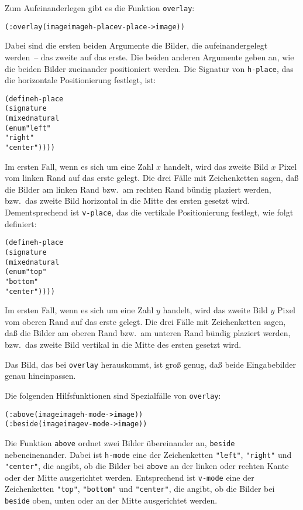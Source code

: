 Zum Aufeinanderlegen gibt es die Funktion \texttt{overlay}:
%
\begin{alltt}
(: overlay (image image h-place v-place -> image))
\end{alltt}
%
Dabei sind die ersten beiden Argumente die Bilder, die
aufeinandergelegt werden~-- das zweite auf das erste.
Die beiden anderen Argumente geben an, wie
die beiden Bilder zueinander positioniert werden.  Die Signatur
von \texttt{h-place}, das die horizontale Positionierung festlegt,
ist:
%
\begin{alltt}
(define h-place
   (signature
      (mixed natural
             (enum "left"
                     "right"
                     "center"))))
\end{alltt}
%
Im ersten Fall, wenn es sich um eine Zahl $x$ handelt, wird das zweite
Bild $x$ Pixel vom linken Rand auf das erste gelegt.  Die drei
Fälle mit Zeichenketten sagen, daß die Bilder am linken Rand bzw.\ am
rechten Rand bündig plaziert werden, bzw.\ das zweite Bild horizontal
in die Mitte des ersten gesetzt wird.
Dementsprechend ist
\texttt{v-place}, das die vertikale Positionierung festlegt,
wie folgt definiert:
%
\begin{alltt}
(define h-place
   (signature
      (mixed natural
             (enum "top"
                     "bottom"
                     "center"))))
\end{alltt}
%
Im ersten Fall, wenn es sich um eine Zahl $y$ handelt, wird das zweite
Bild $y$ Pixel vom oberen Rand auf das erste gelegt.  Die drei
Fälle mit Zeichenketten sagen, daß die Bilder am oberen Rand bzw.\ am
unteren Rand bündig plaziert werden, bzw.\ das zweite Bild vertikal
in die Mitte des ersten gesetzt wird.

Das Bild, das bei \texttt{overlay} herauskommt, ist groß genug, daß
beide Eingabebilder genau hineinpassen.

Die folgenden Hilfsfunktionen sind Spezialfälle von \texttt{overlay}:
%
\begin{alltt}
(: above  (image image h-mode -> image))
(: beside (image image v-mode -> image))
\end{alltt}
%
Die Funktion \texttt{above} ordnet zwei
Bilder übereinander an, \texttt{beside}
nebeneinenander.  Dabei ist \texttt{h-mode} eine der Zeichenketten
\verb|"left"|, \verb|"right"| und \verb|"center"|, die angibt, ob die
Bilder bei \texttt{above} an der linken oder rechten Kante oder der
Mitte ausgerichtet werden.  Entsprechend ist \texttt{v-mode} eine der
Zeichenketten \verb|"top"|, \verb|"bottom"| und \verb|"center"|, die
angibt, ob die Bilder bei \texttt{beside} oben, unten oder an der
Mitte ausgerichtet werden.

